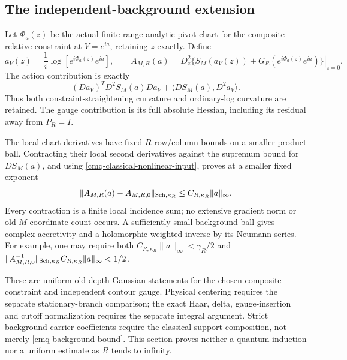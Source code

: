 \subsection{The independent-background extension}
\label{cmq-background-section}

Let $\Phi_a(z)$ be the actual finite-range analytic pivot chart
for the composite relative constraint at $V=e^{ia}$, retaining
$z$ exactly. Define
\begin{equation}
 a_V(z)=\frac1i\log[e^{i\Phi_a(z)}e^{ia}],\qquad
 A_{M,R}(a)
 =\left.D_z^2\{S_M(a_V(z))+G_R(e^{i\Phi_a(z)}e^{ia})\}
                                                     \right|_{z=0}.
 \label{cmq-background-precision}
\end{equation}
The action contribution is exactly
\begin{equation}
 (Da_V)^T D^2S_M(a)Da_V+\langle DS_M(a),D^2a_V\rangle.
 \label{cmq-chain-rule}
\end{equation}
Thus both constraint-straightening curvature and ordinary-log
curvature are retained. The gauge contribution is its full
absolute Hessian, including its residual away from $P_R=I$.

The local chart derivatives have fixed-$R$ row/column bounds on
a smaller product ball. Contracting their local second
derivatives against the supremum bound for $DS_M(a)$, and using
\eqref{cmq-classical-nonlinear-input}, proves at a smaller fixed
exponent
\begin{equation}
 \|A_{M,R}(a)-A_{M,R,0}\|_{{\rm Sch},\kappa_R}
 \leq C_{R,\kappa_R}\|a\|_\infty.
 \label{cmq-background-bound}
\end{equation}
Every contraction is a finite local incidence sum; no extensive
gradient norm or old-$M$ coordinate count occurs. A sufficiently
small background ball gives complex accretivity and a
holomorphic weighted inverse by its Neumann series. For example,
one may require both
$C_{R,\kappa_R}\|a\|_\infty<\gamma_R/2$ and
$\|A_{M,R,0}^{-1}\|_{{\rm Sch},\kappa_R}
 C_{R,\kappa_R}\|a\|_\infty<1/2$.

These are uniform-old-depth Gaussian statements for the chosen
composite constraint and independent contour gauge. Physical
centering requires the separate stationary-branch comparison;
the exact Haar, delta, gauge-insertion and cutoff normalization
requires the separate integral argument. Strict background
carrier coefficients require the classical support composition,
not merely \eqref{cmq-background-bound}. This section proves
neither a quantum induction nor a uniform estimate as $R$ tends
to infinity.
